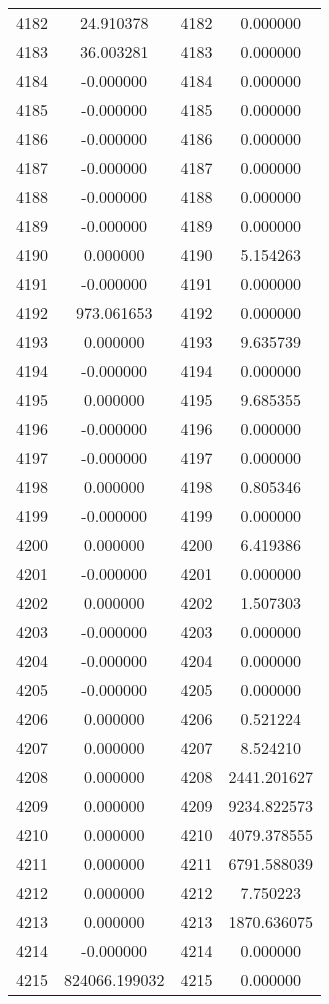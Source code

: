 \documentclass[12pt]{article}
\begin{document}
\begin{longtable}{@{}cccc@{}}
4182 & 24.910378 & 4182 & 0.000000 \\
4183 & 36.003281 & 4183 & 0.000000 \\
4184 & -0.000000 & 4184 & 0.000000 \\
4185 & -0.000000 & 4185 & 0.000000 \\
4186 & -0.000000 & 4186 & 0.000000 \\
4187 & -0.000000 & 4187 & 0.000000 \\
4188 & -0.000000 & 4188 & 0.000000 \\
4189 & -0.000000 & 4189 & 0.000000 \\
4190 & 0.000000 & 4190 & 5.154263 \\
4191 & -0.000000 & 4191 & 0.000000 \\
4192 & 973.061653 & 4192 & 0.000000 \\
4193 & 0.000000 & 4193 & 9.635739 \\
4194 & -0.000000 & 4194 & 0.000000 \\
4195 & 0.000000 & 4195 & 9.685355 \\
4196 & -0.000000 & 4196 & 0.000000 \\
4197 & -0.000000 & 4197 & 0.000000 \\
4198 & 0.000000 & 4198 & 0.805346 \\
4199 & -0.000000 & 4199 & 0.000000 \\
4200 & 0.000000 & 4200 & 6.419386 \\
4201 & -0.000000 & 4201 & 0.000000 \\
4202 & 0.000000 & 4202 & 1.507303 \\
4203 & -0.000000 & 4203 & 0.000000 \\
4204 & -0.000000 & 4204 & 0.000000 \\
4205 & -0.000000 & 4205 & 0.000000 \\
4206 & 0.000000 & 4206 & 0.521224 \\
4207 & 0.000000 & 4207 & 8.524210 \\
4208 & 0.000000 & 4208 & 2441.201627 \\
4209 & 0.000000 & 4209 & 9234.822573 \\
4210 & 0.000000 & 4210 & 4079.378555 \\
4211 & 0.000000 & 4211 & 6791.588039 \\
4212 & 0.000000 & 4212 & 7.750223 \\
4213 & 0.000000 & 4213 & 1870.636075 \\
4214 & -0.000000 & 4214 & 0.000000 \\
4215 & 824066.199032 & 4215 & 0.000000 \\

\end{longtable}
\end{document}
